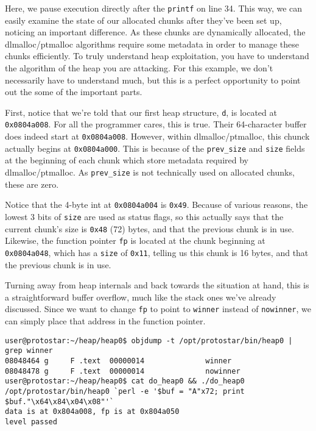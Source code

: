 Here, we pause execution directly after the \texttt{printf} on line 34.
This way, we can easily examine the state of our allocated chunks
after they've been set up, noticing an important difference. As these
chunks are dynamically allocated, the dlmalloc/ptmalloc algorithms
require some metadata in order to manage these chunks efficiently.
To truly understand heap exploitation, you have to understand the algorithm
of the heap you are attacking. For this example, we don't necessarily
have to understand much, but this is a perfect opportunity to point out the
some of the important parts.

First, notice that we're told that our first heap structure, \texttt{d},
is located at \texttt{0x0804a008}. For all the programmer cares, this is
true. Their 64-character buffer does indeed start at \texttt{0x0804a008}.
However, within dlmalloc/ptmalloc, this chunck actually begins at 
\texttt{0x0804a000}. This is because of the \texttt{prev\_size} and
\texttt{size} fields at the beginning of each chunk which store
metadata required by dlmalloc/ptmalloc. As \texttt{prev\_size} is
not technically used on allocated chunks, these are zero.

Notice that the 4-byte int at \texttt{0x0804a004} is \texttt{0x49}.
Because of various reasons, the lowest 3
bits of \texttt{size} are used as status flags, so this actually
says that the current chunk's size is \texttt{0x48} (72) bytes, and
that the previous chunk is in use. Likewise, the function
pointer \texttt{fp} is located at the chunk beginning at
\texttt{0x0804a048}, which has a \texttt{size} of \texttt{0x11},
telling us this chunk is 16 bytes, and that the previous chunk is in use. 

Turning away from heap internals and back towards the situation at hand,
this is a straightforward buffer overflow, much like the stack ones we've
already discussed. Since we want to change \texttt{fp} to point to
\texttt{winner} instead of \texttt{nowinner}, we can simply place that
address in the function pointer.

\begin{lstlisting}
user@protostar:~/heap/heap0$ objdump -t /opt/protostar/bin/heap0 | grep winner
08048464 g     F .text  00000014              winner
08048478 g     F .text  00000014              nowinner
user@protostar:~/heap/heap0$ cat do_heap0 && ./do_heap0
/opt/protostar/bin/heap0 `perl -e '$buf = "A"x72; print $buf."\x64\x84\x04\x08"'`
data is at 0x804a008, fp is at 0x804a050
level passed
\end{lstlisting}

